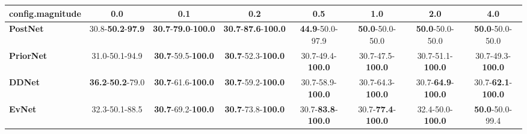 \begin{tabular}{lccccccc}
\toprule
\textbf{config.magnitude} &                               0.0 &                                         0.1 &                                         0.2 &                                0.5 &                                1.0 &                                2.0 &                                4.0 \\
\midrule
\textbf{PostNet } &  30.8-\textbf{50.2}-\textbf{97.9} &  \textbf{30.7}-\textbf{79.0}-\textbf{100.0} &  \textbf{30.7}-\textbf{87.6}-\textbf{100.0} &            \textbf{44.9}-50.0-97.9 &            \textbf{50.0}-50.0-50.0 &            \textbf{50.0}-50.0-50.0 &            \textbf{50.0}-50.0-50.0 \\
\textbf{PriorNet} &                    31.0-50.1-94.9 &           \textbf{30.7}-59.5-\textbf{100.0} &           \textbf{30.7}-52.3-\textbf{100.0} &           30.7-49.4-\textbf{100.0} &           30.7-47.5-\textbf{100.0} &           30.7-51.1-\textbf{100.0} &                        30.7-49.3-\textbf{100.0} \\
\textbf{DDNet   } &  \textbf{36.2}-\textbf{50.2}-79.0 &           \textbf{30.7}-61.6-\textbf{100.0} &           \textbf{30.7}-59.2-\textbf{100.0} &           30.7-58.9-\textbf{100.0} &           30.7-64.3-\textbf{100.0} &  30.7-\textbf{64.9}-\textbf{100.0} &  30.7-\textbf{62.1}-\textbf{100.0} \\
\textbf{EvNet   } &                    32.3-50.1-88.5 &           \textbf{30.7}-69.2-\textbf{100.0} &           \textbf{30.7}-73.8-\textbf{100.0} &  30.7-\textbf{83.8}-\textbf{100.0} &  30.7-\textbf{77.4}-\textbf{100.0} &           32.4-50.0-\textbf{100.0} &            \textbf{50.0}-50.0-99.4 \\
\bottomrule
\end{tabular}
